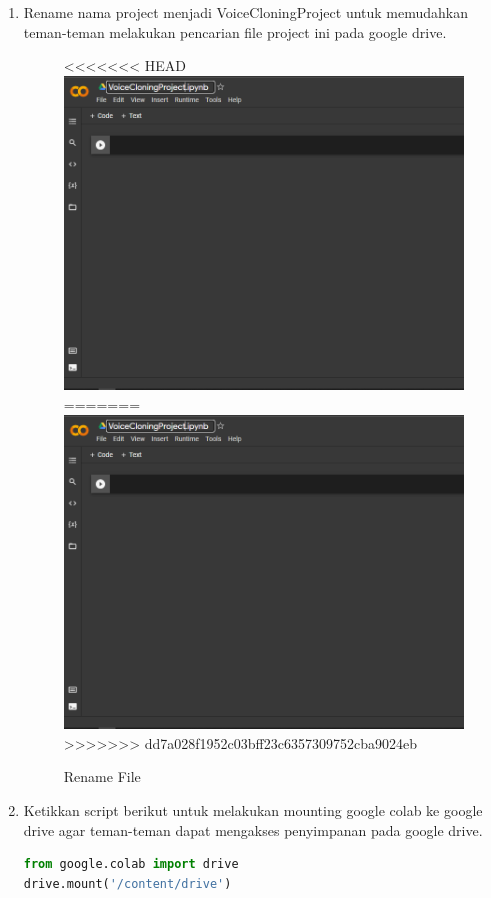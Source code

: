 \begin{enumerate}
\item Rename nama project menjadi VoiceCloningProject untuk memudahkan teman-teman melakukan pencarian file project ini pada google drive.
\begin{figure}[H]
    \centering
<<<<<<< HEAD
    \includegraphics[scale=0.3]{figures/colab2}
=======
    \includegraphics[scale=0.5]{figures/colab2}
>>>>>>> dd7a028f1952c03bff23c6357309752cba9024eb
    \caption{Rename File}
    \label{colab2}
\end{figure}

\item Ketikkan script berikut untuk melakukan mounting google colab ke google drive agar teman-teman dapat mengakses penyimpanan pada google drive.
\begin{lstlisting}[language=Python, caption=Mounting Google Drive]
from google.colab import drive
drive.mount('/content/drive')
\end{lstlisting}


\end{enumerate}

